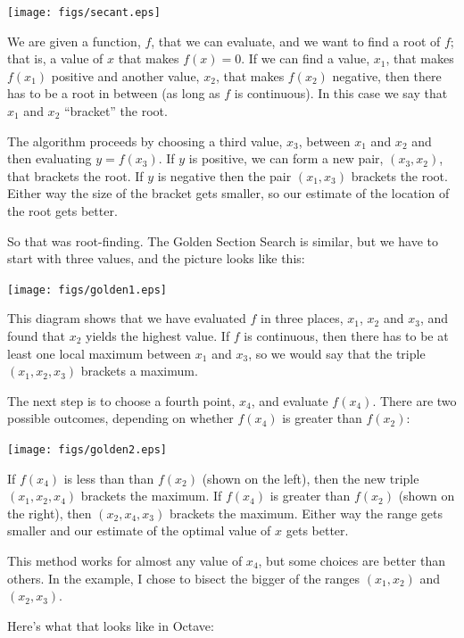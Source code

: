 \documentclass{book}
\begin{document}
\beforefig \centerline{\texttt{[image: figs/secant.eps]}}

We are given a function, $f$, that we can evaluate, and
we want to find a root of $f$; that is, a value of $x$ that makes
$f(x)=0$. If we can find a value, $x_1$, that makes $f(x_1)$ positive
and another value, $x_2$, that makes $f(x_2)$ negative, then there has
to be a root in between (as long as $f$ is continuous). In this
case we say that $x_1$ and $x_2$ ``bracket'' the root.

The algorithm proceeds by choosing a third value, $x_3$, between
$x_1$ and $x_2$ and then evaluating $y = f(x_3)$. If $y$ is
positive, we can form a new pair, $(x_3, x_2)$, that brackets the
root. If $y$ is negative then the pair $(x_1, x_3)$ brackets the root.
Either way the size of the bracket gets smaller, so our
estimate of the location of the root gets better.

So that was root-finding. The Golden Section Search is similar, but
we have to start with three values, and the picture looks like
this:

\beforefig \centerline{\texttt{[image: figs/golden1.eps]}}

This diagram shows that we have evaluated $f$ in three places,
$x_1$, $x_2$ and $x_3$, and found that $x_2$ yields the highest
value. If $f$ is continuous, then there has to be at least one
local maximum between $x_1$ and $x_3$, so we would say that the
triple $(x_1, x_2, x_3)$ brackets a maximum.

The next step is to choose a fourth point, $x_4$, and evaluate
$f(x_4)$. There are two possible outcomes, depending on whether
$f(x_4)$ is greater than $f(x_2)$:

\beforefig \centerline{\texttt{[image: figs/golden2.eps]}}

If $f(x_4)$ is less than than $f(x_2)$ (shown on the left), then the
new triple $(x_1, x_2, x_4)$ brackets the maximum. If $f(x_4)$ is
greater than $f(x_2)$ (shown on the right), then $(x_2, x_4, x_3)$
brackets the maximum. Either way the range gets smaller and our
estimate of the optimal value of $x$ gets better.

This method works for almost any value of $x_4$, but some choices
are better than others. In the example, I chose to bisect the
bigger of the ranges $(x_1, x_2)$ and $(x_2, x_3)$.

Here's what that looks like in Octave:
\end{document}

